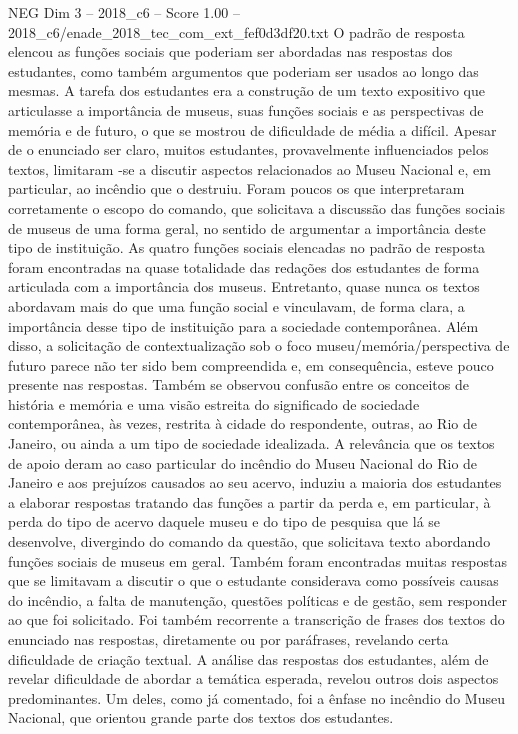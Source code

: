 \begin{textsample}{NEG Dim 3 – 2018\_c6 – Score 1.00 – 2018\_c6/enade\_2018\_tec\_com\_ext\_fef0d3df20.txt}
O padrão de resposta elencou as funções sociais que poderiam ser abordadas nas respostas dos estudantes, como também argumentos que poderiam ser usados ao longo das mesmas.
A tarefa dos estudantes era a construção de um texto expositivo que articulasse a importância de museus, suas funções sociais e as perspectivas de memória e de futuro, o que se mostrou de dificuldade de média a difícil.
Apesar de o enunciado ser claro, muitos estudantes, provavelmente influenciados pelos textos, limitaram -se a discutir aspectos relacionados ao Museu Nacional e, em particular, ao incêndio que o destruiu.
Foram poucos os que interpretaram corretamente o escopo do comando, que solicitava a discussão das funções sociais de museus de uma forma geral, no sentido de argumentar a importância deste tipo de instituição.
As quatro funções sociais elencadas no padrão de resposta foram encontradas na quase totalidade das redações dos estudantes de forma articulada com a importância dos museus.
Entretanto, quase nunca os textos abordavam mais do que uma função social e vinculavam, de forma clara, a importância desse tipo de instituição para a sociedade contemporânea.
Além disso, a solicitação de contextualização sob o foco museu/memória/perspectiva de futuro parece não ter sido bem compreendida e, em consequência, esteve pouco presente nas respostas.
Também se observou confusão entre os conceitos de história e memória e uma visão estreita do significado de sociedade contemporânea, às vezes, restrita à cidade do respondente, outras, ao Rio de Janeiro, ou ainda a um tipo de sociedade idealizada.
A relevância que os textos de apoio deram ao caso particular do incêndio do Museu Nacional do Rio de Janeiro e aos prejuízos causados ao seu acervo, induziu a maioria dos estudantes a elaborar respostas tratando das funções a partir da perda e, em particular, à perda do tipo de acervo daquele museu e do tipo de pesquisa que lá se desenvolve, divergindo do comando da questão, que solicitava texto abordando funções sociais de museus em geral.
Também foram encontradas muitas respostas que se limitavam a discutir o que o estudante considerava como possíveis causas do incêndio, a falta de manutenção, questões políticas e de gestão, sem responder ao que foi solicitado.
Foi também recorrente a transcrição de frases dos textos do enunciado nas respostas, diretamente ou por paráfrases, revelando certa dificuldade de criação textual.
A análise das respostas dos estudantes, além de revelar dificuldade de abordar a temática esperada, revelou outros dois aspectos predominantes.
Um deles, como já comentado, foi a ênfase no incêndio do Museu Nacional, que orientou grande parte dos textos dos estudantes.

\end{textsample}
